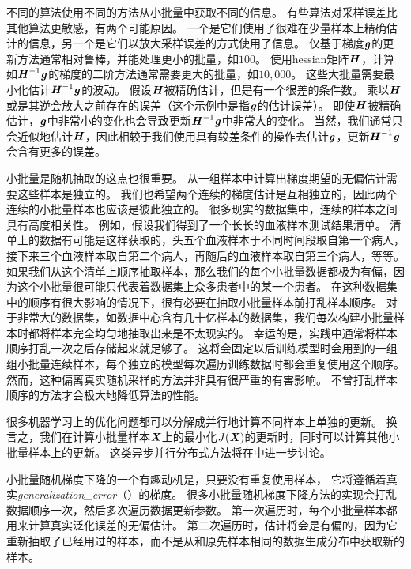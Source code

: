 不同的算法使用不同的方法从小批量中获取不同的信息。
有些算法对采样误差比其他算法更敏感，有两个可能原因。
一个是它们使用了很难在少量样本上精确估计的信息，另一个是它们以放大采样误差的方式使用了信息。
仅基于梯度$\boldsymbol{\mathit{g}}$的更新方法通常相对鲁棒，并能处理更小的批量，如$100$。
使用\gls{hessian}矩阵$\boldsymbol{\mathit{H}}$，计算如$\boldsymbol{\mathit{H}}^{-1}\boldsymbol{\mathit{g}}$的梯度的二阶方法通常需要更大的批量，如$10,000$。
这些大批量需要最小化估计$\boldsymbol{\mathit{H}}^{-1}\boldsymbol{\mathit{g}}$的波动。
假设$\boldsymbol{\mathit{H}}$被精确估计，但是有一个很差的条件数。
乘以$\boldsymbol{\mathit{H}}$或是其逆会放大之前存在的误差（这个示例中是指$\boldsymbol{\mathit{g}}$的估计误差）。
即使$\boldsymbol{\mathit{H}}$被精确估计，$\boldsymbol{\mathit{g}}$中非常小的变化也会导致更新$\boldsymbol{\mathit{H}}^{-1}\boldsymbol{\mathit{g}}$中非常大的变化。
当然，我们通常只会近似地估计$\boldsymbol{\mathit{H}}$，因此相较于我们使用具有较差条件的操作去估计$\boldsymbol{\mathit{g}}$，更新$\boldsymbol{\mathit{H}}^{-1}\boldsymbol{\mathit{g}}$会含有更多的误差。


小批量是随机抽取的这点也很重要。
从一组样本中计算出梯度期望的无偏估计需要这些样本是独立的。
我们也希望两个连续的梯度估计是互相独立的，因此两个连续的小批量样本也应该是彼此独立的。
很多现实的数据集中，连续的样本之间具有高度相关性。
例如，假设我们得到了一个长长的血液样本测试结果清单。
清单上的数据有可能是这样获取的，头五个血液样本于不同时间段取自第一个病人，接下来三个血液样本取自第二个病人，再随后的血液样本取自第三个病人，等等。
如果我们从这个清单上顺序抽取样本，那么我们的每个小批量数据都极为有偏，因为这个小批量很可能只代表着数据集上众多患者中的某一个患者。
在这种数据集中的顺序有很大影响的情况下，很有必要在抽取小批量样本前打乱样本顺序。
对于非常大的数据集，如数据中心含有几十亿样本的数据集，我们每次构建小批量样本时都将样本完全均匀地抽取出来是不太现实的。
幸运的是，实践中通常将样本顺序打乱一次之后存储起来就足够了。
这将会固定以后训练模型时会用到的一组组小批量连续样本，每个独立的模型每次遍历训练数据时都会重复使用这个顺序。
然而，这种偏离真实随机采样的方法并非具有很严重的有害影响。
不曾打乱样本顺序的方法才会极大地降低算法的性能。

很多机器学习上的优化问题都可以分解成并行地计算不同样本上单独的更新。
换言之，我们在计算小批量样本$\boldsymbol{\mathit{X}}$上的最小化$J(\boldsymbol{\mathit{X}})$的更新时，同时可以计算其他小批量样本上的更新。
这类异步并行分布式方法将在中进一步讨论。

小批量随机梯度下降的一个有趣动机是，只要没有重复使用样本，
它将遵循着真实\emph{\gls{generalization_error}}（）的梯度。
很多小批量随机梯度下降方法的实现会打乱数据顺序一次，然后多次遍历数据更新参数。
第一次遍历时，每个小批量样本都用来计算真实泛化误差的无偏估计。
第二次遍历时，估计将会是有偏的，因为它重新抽取了已经用过的样本，而不是从和原先样本相同的数据生成分布中获取新的样本。


